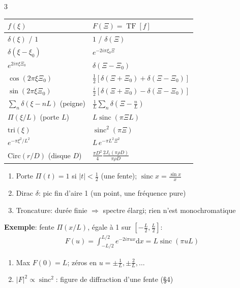 \documentclass[12pt, a4paper]{article}
\newcommand{\TF}{\operatorname{TF}}
\newcommand{\sinc}{\operatorname{sinc}}
\newcommand{\porte}{\Pi}
\newcommand{\dd}{\mathrm{d}}
\begin{document}
\begin{multicols*}{3}
	\begin{tabular}{|l|l|}
		\hline
		$f(\xi)$                          & $F(\Xi)=\TF[f]$                                      \\
		\hline
		$\delta(\xi)$ / $1$               & $1$ / $\delta(\Xi)$                                  \\
		$\delta(\xi-\xi_0)$               & $e^{-2i\pi\xi_0\Xi}$                                 \\
		$e^{2i\pi\xi\Xi_0}$               & $\delta(\Xi-\Xi_0)$                                  \\
		$\cos(2\pi\xi\Xi_0)$              & $\tfrac12[\delta(\Xi+\Xi_0)+\delta(\Xi-\Xi_0)]$      \\
		$\sin(2\pi\xi\Xi_0)$              & $\tfrac{i}{2}[\delta(\Xi+\Xi_0)-\delta(\Xi-\Xi_0)]$  \\
		$\sum_n\delta(\xi-nL)$ (peigne)   & $\frac1L\sum_n\delta(\Xi-\frac nL)$                  \\
		$\porte(\xi/L)$ (porte $L$)       & $L\sinc(\pi\Xi L)$                                   \\
		$\mathrm{tri}(\xi)$               & $\sinc^2(\pi\Xi)$                                    \\
		$e^{-\pi\xi^2/L^2}$               & $L\,e^{-\pi L^2\Xi^2}$                               \\
		$\mathrm{Circ}(r/D)$ (disque $D$) & $\frac{\pi D^2}{4}\frac{2J_1(\pi\rho D)}{\pi\rho D}$ \\
		\hline
	\end{tabular}
	\begin{enumerate}[\roman*.]
		\item Porte $\porte(t)=1$ si $|t|<\frac12$ (une fente); $\sinc x=\frac{\sin x}{x}$
		\item Dirac $\delta$: pic fin d'aire 1 (un point, une fréquence pure)
		\item Troncature: durée finie $\Rightarrow$ spectre élargi; rien n'est monochromatique
	\end{enumerate}

	\textbf{Exemple}: fente $\porte(x/L)$, égale à 1 sur $[-\frac L2,\frac L2]$:
	\begin{gather*}
		F(u)=\int_{-L/2}^{L/2}e^{-2i\pi ux}\dd x=L\sinc(\pi uL)
	\end{gather*}
	\begin{enumerate}[\roman*.]
		\item Max $F(0)=L$; zéros en $u=\pm\frac1L,\pm\frac2L,\ldots$
		\item $|F|^2\propto\sinc^2$: figure de diffraction d'une fente (§4)
	\end{enumerate}


\end{multicols*}
\end{document}
